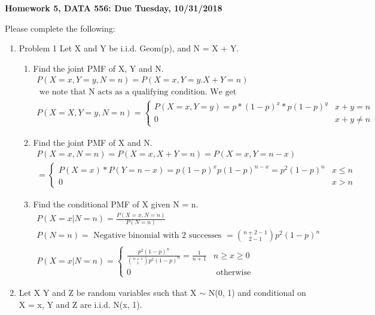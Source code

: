 \documentclass[11pt]{article}
\begin{document}
\begin{title}
	{\Large\bf Homework 5, DATA 556: Due Tuesday, 10/31/2018}
\end{title}

\author{\bf Alexander Van Roijen}

\maketitle

\newpage
Please complete the following:
\begin{enumerate}
\item Problem 1
Let X and Y be i.i.d. Geom(p), and N = X + Y.
\begin{enumerate}
	\item Find the joint PMF of X, Y and N.
	\begin{gather}
		P(X=x,Y=y,N=n) = P(X=x,Y=y.X+Y=n) \\
		 \text{ we note that N acts as a qualifying condition. We get } \\
		P(X=X,Y=y,N=n) = \begin{cases}
		P(X=x,Y=y)=p*(1-p)^x*p(1-p)^y & x+y=n\\
		0 & x+y \ne n
		\end{cases}
	\end{gather}
	\item Find the joint PMF of X and N.
	\begin{gather}
		P(X=x,N=n) = P(X=x,X+Y=n)=P(X=x,Y=n-x)\\
		= \begin{cases}
			P(X=x)*P(Y=n-x) =p(1-p)^xp(1-p)^{n-x}=p^2(1-p)^n &x\le n\\
			0 & x>n
		  \end{cases}
	\end{gather}
	\item Find the conditional PMF of X given N = n.
	\begin{gather}
		P(X=x|N=n)=\frac{P(X=x,N=n)}{P(N=n)}\\
		P(N=n) = \text{ Negative binomial with 2 successes } = \binom{n+2-1}{2-1}p^2(1-p)^n \\
		P(X=x|N=n) = \begin{cases}
		\frac{p^2(1-p)^n}{\binom{n+1}{1}p^2(1-p)^n}  = \frac{1}{n+1}& n\ge x \ge 0 \\
		0 & \text{ otherwise }
		\end{cases}
	\end{gather}
\end{enumerate}
\item Let X Y and Z be random variables such that X $\sim$ N(0, 1) and conditional on X = x, Y and Z are i.i.d. N(x, 1).

\end{enumerate}
\end{document}
